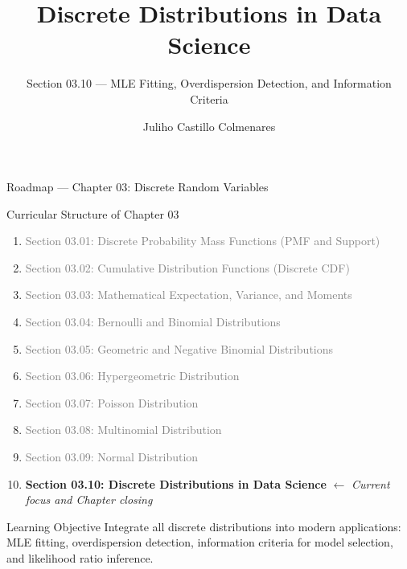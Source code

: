 \documentclass[aspectratio=169,xcolor={dvipsnames,table}]{beamer}
\title{Discrete Distributions in Data Science}
\subtitle{Section 03.10 --- MLE Fitting, Overdispersion Detection, and Information Criteria}
\author[J. Castillo Colmenares]{Juliho Castillo Colmenares}
\institute[Tec de Monterrey]{Tecnologico de Monterrey}
\date{\vspace{-1.5cm}}
\begin{document}
\begin{frame}[plain]
	\titlepage
\end{frame}

\begin{frame}{Roadmap --- Chapter 03: Discrete Random Variables}
	\vspace{-0.15cm}
	\begin{block}{Curricular Structure of Chapter 03}
		\footnotesize
		\begin{enumerate}\itemsep=0.01cm
			\item \textcolor{gray}{Section 03.01: Discrete Probability Mass Functions (PMF and Support)}
			\item \textcolor{gray}{Section 03.02: Cumulative Distribution Functions (Discrete CDF)}
			\item \textcolor{gray}{Section 03.03: Mathematical Expectation, Variance, and Moments}
			\item \textcolor{gray}{Section 03.04: Bernoulli and Binomial Distributions}
			\item \textcolor{gray}{Section 03.05: Geometric and Negative Binomial Distributions}
			\item \textcolor{gray}{Section 03.06: Hypergeometric Distribution}
			\item \textcolor{gray}{Section 03.07: Poisson Distribution}
			\item \textcolor{gray}{Section 03.08: Multinomial Distribution}
			\item \textcolor{gray}{Section 03.09: Normal Distribution}
			\item \textbf{\textcolor{TecRojo}{Section 03.10: Discrete Distributions in Data Science}} $\leftarrow$ \emph{Current focus and Chapter closing}
		\end{enumerate}
	\end{block}
	\vspace{-0.3cm}
	\begin{alertblock}{Learning Objective}
		\scriptsize
		Integrate all discrete distributions into modern applications: MLE fitting, overdispersion detection, information criteria for model selection, and likelihood ratio inference.
	\end{alertblock}
\end{frame}
\end{document}
